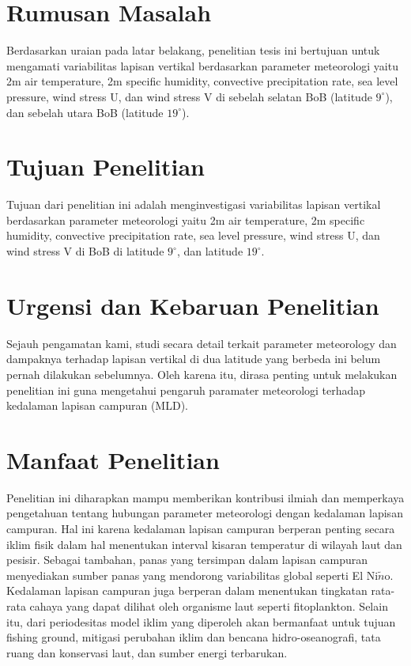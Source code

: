 \begin{spacing}{1.5}
	\section[Rumusan Masalah]{Rumusan Masalah}
	Berdasarkan uraian pada latar belakang, penelitian tesis ini bertujuan untuk mengamati variabilitas lapisan vertikal berdasarkan parameter meteorologi yaitu 2m air temperature, 2m specific humidity, convective precipitation rate, sea level pressure, wind stress U, dan wind stress V di sebelah selatan BoB (latitude $9^\circ$), dan sebelah utara BoB (latitude $19^\circ$).
	
	\section[Tujuan Penelitian]{Tujuan Penelitian}
	
	Tujuan dari penelitian ini adalah menginvestigasi variabilitas lapisan vertikal berdasarkan parameter meteorologi yaitu 2m air temperature, 2m specific humidity, convective precipitation rate, sea level pressure, wind stress U, dan wind stress V di BoB di latitude $9^\circ$, dan latitude $19^\circ$. 
	
	\section[Urgensi dan Kebaruan Penelitian]{Urgensi dan Kebaruan Penelitian}

	Sejauh pengamatan kami, studi secara detail terkait parameter meteorology dan dampaknya terhadap lapisan vertikal di dua latitude yang berbeda ini belum pernah dilakukan sebelumnya. Oleh karena itu, dirasa penting untuk melakukan penelitian ini guna mengetahui pengaruh paramater meteorologi terhadap kedalaman lapisan campuran (MLD).

	\section[Manfaat Penelitian]{Manfaat Penelitian}
	
	Penelitian ini diharapkan mampu memberikan kontribusi ilmiah dan memperkaya pengetahuan tentang hubungan parameter meteorologi dengan kedalaman lapisan campuran. Hal ini karena kedalaman lapisan campuran berperan penting secara iklim fisik dalam hal menentukan interval kisaran temperatur di wilayah laut dan pesisir. Sebagai tambahan, panas yang tersimpan dalam  lapisan campuran menyediakan sumber panas yang mendorong variabilitas global seperti El Ni$\tilde{n}$o. Kedalaman lapisan campuran juga berperan dalam menentukan tingkatan rata-rata cahaya yang dapat dilihat oleh organisme laut seperti fitoplankton. Selain itu, dari periodesitas model iklim yang diperoleh akan bermanfaat untuk tujuan fishing ground, mitigasi perubahan iklim dan bencana hidro-oseanografi, tata ruang dan konservasi
	laut, dan sumber energi terbarukan. 


\end{spacing}
